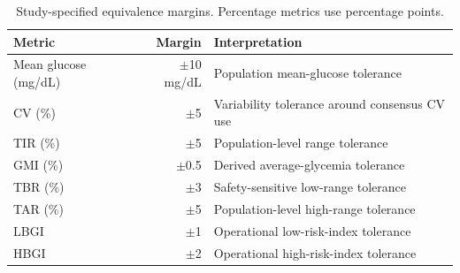 \begin{table}[!t]
\centering
\caption{Study-specified equivalence margins. Percentage metrics use percentage points.}
\label{tab:margins}
\begin{tabular}{lrl}
\toprule
Metric & Margin & Interpretation \\
\midrule
Mean glucose (mg/dL) & $\pm$10 mg/dL & Population mean-glucose tolerance \\
CV (\%) & $\pm$5 & Variability tolerance around consensus CV use \\
TIR (\%) & $\pm$5 & Population-level range tolerance \\
GMI (\%) & $\pm$0.5 & Derived average-glycemia tolerance \\
TBR (\%) & $\pm$3 & Safety-sensitive low-range tolerance \\
TAR (\%) & $\pm$5 & Population-level high-range tolerance \\
LBGI & $\pm$1 & Operational low-risk-index tolerance \\
HBGI & $\pm$2 & Operational high-risk-index tolerance \\
\bottomrule
\end{tabular}
\end{table}
